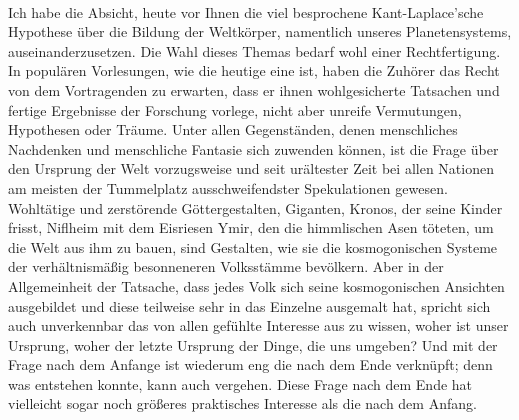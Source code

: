 \documentclass[a4paper, 11pt, oneside, german]{article}
\begin{document}
\paragraph{}
Ich habe die Absicht, heute vor Ihnen die viel besprochene Kant-Laplace'sche Hypothese über die Bildung der Weltkörper, namentlich unseres Planetensystems, auseinanderzusetzen. Die Wahl dieses Themas bedarf wohl einer Rechtfertigung. In populären Vorlesungen, wie die heutige eine ist, haben die Zuhörer das Recht von dem Vortragenden zu erwarten, dass er ihnen wohlgesicherte Tatsachen und fertige Ergebnisse der Forschung vorlege, nicht aber unreife Vermutungen, Hypothesen oder Träume. Unter allen Gegenständen, denen menschliches Nachdenken und menschliche Fantasie sich zuwenden können, ist die Frage über den Ursprung der Welt vorzugsweise und seit urältester Zeit bei allen Nationen am meisten der Tummelplatz ausschweifendster Spekulationen gewesen. Wohltätige und zerstörende Göttergestalten, Giganten, Kronos, der seine Kinder frisst, Niflheim mit dem Eisriesen Ymir, den die himmlischen Asen töteten, um die Welt aus ihm zu bauen, sind Gestalten, wie sie die kosmogonischen Systeme der verhältnismäßig besonneneren Volksstämme bevölkern. Aber in der Allgemeinheit der Tatsache, dass jedes Volk sich seine kosmogonischen Ansichten ausgebildet und diese teilweise sehr in das Einzelne ausgemalt hat, spricht sich auch unverkennbar das von allen gefühlte Interesse aus zu wissen, woher ist unser Ursprung, woher der letzte Ursprung der Dinge, die uns umgeben? Und mit der Frage nach dem Anfange ist wiederum eng die nach dem Ende verknüpft; denn was entstehen konnte, kann auch vergehen. Diese Frage nach dem Ende hat vielleicht sogar noch größeres praktisches Interesse als die nach dem Anfang.
\end{document}
